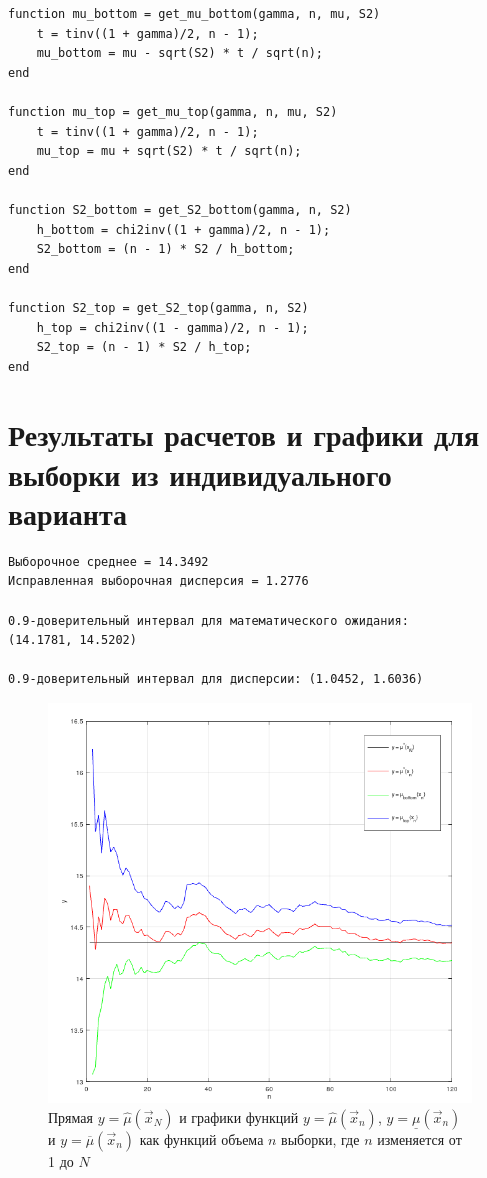 \begin{lstlisting}[style={Matlab}]
function mu_bottom = get_mu_bottom(gamma, n, mu, S2)
    t = tinv((1 + gamma)/2, n - 1);
    mu_bottom = mu - sqrt(S2) * t / sqrt(n);
end

function mu_top = get_mu_top(gamma, n, mu, S2)
    t = tinv((1 + gamma)/2, n - 1);
    mu_top = mu + sqrt(S2) * t / sqrt(n);
end

function S2_bottom = get_S2_bottom(gamma, n, S2)
    h_bottom = chi2inv((1 + gamma)/2, n - 1);
    S2_bottom = (n - 1) * S2 / h_bottom;
end

function S2_top = get_S2_top(gamma, n, S2)
    h_top = chi2inv((1 - gamma)/2, n - 1);
    S2_top = (n - 1) * S2 / h_top;
end
\end{lstlisting}

\section{Результаты расчетов и графики для выборки из индивидуального варианта}

\begin{lstlisting}[style={Matlab}]
Выборочное среднее = 14.3492
Исправленная выборочная дисперсия = 1.2776

0.9-доверительный интервал для математического ожидания:
(14.1781, 14.5202)

0.9-доверительный интервал для дисперсии: (1.0452, 1.6036)
\end{lstlisting}

\begin{figure}[H]
	\begin{center}
		\includegraphics[scale=0.7]{img/Oyn.png}
	\end{center}
	\captionsetup{justification=centering}
	\caption{Прямая $y = \hat\mu(\vec x_{N})$ и графики функций $y = \hat\mu(\vec x_{n})$, $y = \underline{\mu}(\vec x_{n})$ и $y = \overline{\mu}(\vec x_{n})$ как функций объема $n$ выборки, где $n$ изменяется от 1 до $N$}
	\label{img:bar}
\end{figure}

